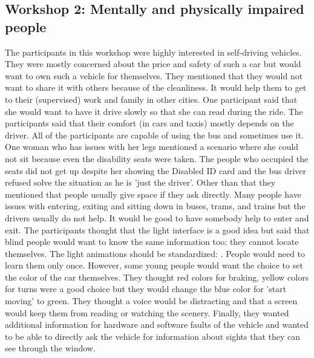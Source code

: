 \subsection{Workshop 2: Mentally and physically impaired people}
The participants in this workshop were highly interested in self-driving vehicles. They were mostly concerned about the price and safety of such a car but would want to own such a vehicle for themselves. They mentioned that they would not want to share it with others because of the cleanliness. It would help them to get to their (supervised) work and family in other cities. One participant said that she would want to have it drive slowly so that she can read during the ride. The participants said that their comfort (in cars and taxis) mostly depends on the driver. All of the participants are capable of using the bus and sometimes use it. One woman who has issues with her legs mentioned a scenario where she could not sit because even the disability seats were taken. The people who occupied the seats did not get up despite her showing the Disabled ID card and the bus driver refused solve the situation as he is 'just the driver'. Other than that they mentioned that people usually give space if they ask directly. Many people have issues with entering, exiting and sitting down in buses, trams, and trains but the drivers usually do not help. It would be good to have somebody help to enter and exit. The participants thought that the light interface is a good idea but said that blind people would want to know the same information too; they cannot locate themselves. The light animations should be standardized: . People would need to learn them only once. However, some young people would want the choice to set the color of the car themselves. They thought red colors for braking, yellow colors for turns were a good choice but they would change the blue color for 'start moving' to green.  They thought a voice would be distracting and that a screen would keep them from reading or watching the scenery. Finally, they wanted additional information for hardware and software faults of the vehicle and wanted to be able to directly ask the vehicle for information about sights that they can see through the window.
